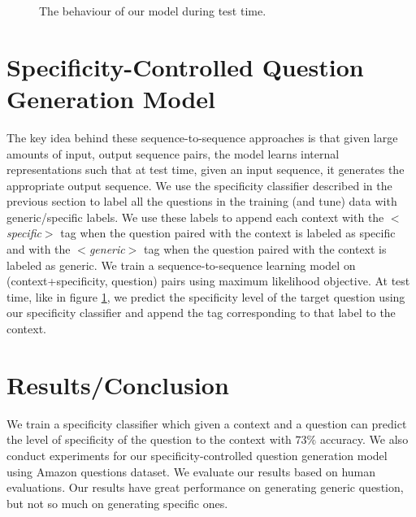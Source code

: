 \documentclass[11pt]{article}
\begin{document}
\begin{figure}[h]
\centering
    \caption{The behaviour of our model during test time.}\label{roadmap}
\end{figure}

\section{Specificity-Controlled Question Generation Model}\label{model}
The key idea behind these sequence-to-sequence approaches is that given large amounts of input, output sequence pairs, the model learns internal representations such that at test time, given an input sequence, it generates the appropriate output sequence. 
We use the specificity classifier described in the previous section to label all the questions in the training (and tune) data with generic/specific labels. 
We use these labels to append each context with the \textit{$<$specific$>$} tag when the question paired with the context is labeled as specific and with the \textit{$<$generic$>$} tag when the question paired with the context is labeled as generic.
We train a sequence-to-sequence learning model \cite{sutskever2014sequence} on (context+specificity, question) pairs using maximum likelihood objective. 
At test time, like in figure \ref{roadmap}, we predict the specificity level of the target question using our specificity classifier and append the tag corresponding to that label to the context. 


\section{Results/Conclusion}
We train a specificity classifier which given a context and a question can predict the level of specificity of the question to the context with $73 \%$ accuracy. 
We also conduct experiments for our specificity-controlled question generation model using Amazon questions dataset. We evaluate our results based on human evaluations. Our results have great performance on generating generic question, but not so much on generating specific ones. 

%
%



\end{document}
